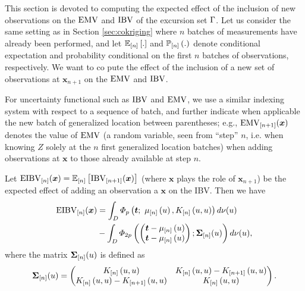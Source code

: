 This section is devoted to computing the expected effect of the inclusion of new observations on the $\mathrm{EMV}$ and $\mathrm{IBV}$ of the excursion set $\Gamma$. Let us consider the same setting as in Section \ref{sec:cokriging} where $n$ batches of measurements have already been performed, and let 
$\mathbb{E}_{[n]} \left[.\right]$ and $\mathbb{P}_{[n]} \left(.\right)$ denote conditional expectation
and probability conditional on the first $n$ batches of observations, respectively. We want to co pute the effect of the inclusion of a new set of observations at $\bm{x}_{n+1}$ on the $\mathrm{EMV}$ and $\mathrm{IBV}$.

For uncertainty functional such as $\mathrm{IBV}$ and $\mathrm{EMV}$, we use a similar indexing system
with respect to a sequence of batch, and further indicate when applicable the new batch
of generalized location between parentheses; e.g., $\mathrm{EMV}_{[n+1]}(\bm{x})$ denotes the value
of $\mathrm{EMV}$ (a random variable, seen from ``step'' $n$, i.e. when knowing $Z$ solely at
the $n$ first generalized location batches) when adding observations at $\bm{x}$ to those
already available at step $n$.

\begin{propo}
\label{propo_eibv}
Let $\mathrm{EIBV}_{[n]}(\bm{x})=\mathbb{E}_{[n]} \left[\mathrm{IBV}_{[n+1]}(\bm{x})\right]$ (where $\bm{x}$ plays
the role of $\bm{x}_{n+1}$) be the expected effect of adding an observation a $\bm{x}$ on the IBV.
Then we have
\begin{equation}
\begin{split}
\eibv_{[n]}(\bm{x})
&=\int_{D} \varPhi_{\no}\left(\bt;~\currentMean{\uu}, \currentCov{u, u}\right) d\mes(u)\\
&-\int_{D} \varPhi_{2\no}
\left(
\left(
\begin{matrix}
\bt-\currentMean{u}\\
\bt-\currentMean{u}
\end{matrix}
\right);
\mathbf{\Sigma}_{[n]}(\uu)
\right)
d\mes(u),
\end{split}
\end{equation}
where the matrix $\mathbf{\Sigma}_{[n]}(u)$ is defined as
\begin{equation*}
\begin{split}
\mathbf{\Sigma}_{[n]}(\uu)&=
\left(
\begin{matrix}
\currentCov{u, u} & \currentCov{u, u}-\futureCov{u, u}\\
\currentCov{u, u}-\futureCov{u, u} & \currentCov{u, u}
\end{matrix}
\right).\\
\end{split}
\end{equation*}
\end{propo}

